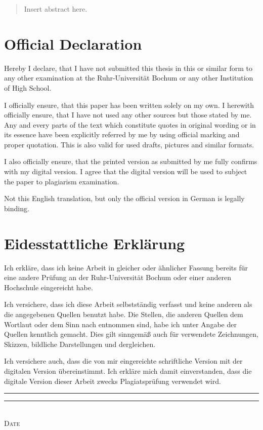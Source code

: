 \begin{abstract}

Insert abstract here.
\end{abstract}

\pagestyle{scrplain} %
\section*{Official Declaration}
Hereby I declare, that I have not submitted this thesis in this or similar form to any other examination at the Ruhr-Universit\"{a}t Bochum or any other Institution of High School.

\noindent
I officially ensure, that this paper has been written solely on my own.
I herewith officially ensure, that I have not used any other sources but those stated by me.
Any and every parts of the text which constitute quotes in original wording or in its essence have been explicitly referred by me by using official marking and proper quotation.
This is also valid for used drafts, pictures and similar formats.

\noindent
I also officially ensure, that the printed version as submitted by me fully confirms with my digital version.
I agree that the digital version will be used to subject the paper to plagiarism examination.

\noindent
Not this English translation, but only the official version in German is legally binding\@.

\section*{Eidesstattliche Erkl\"{a}rung}
{
Ich erkl\"{a}re, dass ich keine Arbeit in gleicher oder \"{a}hnlicher Fassung bereits für eine andere Prüfung an der Ruhr-Universit\"{a}t Bochum oder einer anderen Hochschule eingereicht habe.

\noindent
Ich versichere, dass ich diese Arbeit selbstständig verfasst und keine anderen als die angegebenen Quellen benutzt habe. Die Stellen, die anderen Quellen dem Wortlaut oder dem Sinn nach entnommen sind, habe ich unter Angabe der Quellen kenntlich gemacht.
Dies gilt sinngem\"{a}\ss{} auch für verwendete Zeichnungen, Skizzen, bildliche Darstellungen und dergleichen.

\noindent
Ich versichere auch, dass die von mir eingereichte schriftliche Version mit der digitalen Version übereinstimmt.
Ich erkl\"{a}re mich damit einverstanden, dass die digitale Version dieser Arbeit zwecks Plagiatspr\"{u}fung verwendet wird.\@}

\vspace{2cm}
\rule{4cm}{0.1pt} \hfill \rule{7cm}{0.1pt} \\
\hspace*{1.75cm} \textsc{Date} \hspace*{6.8cm} \textsc{\@author}

\cleardoublepage
\pagestyle{scrheadings} %

\tableofcontents

\cleardoublepage
